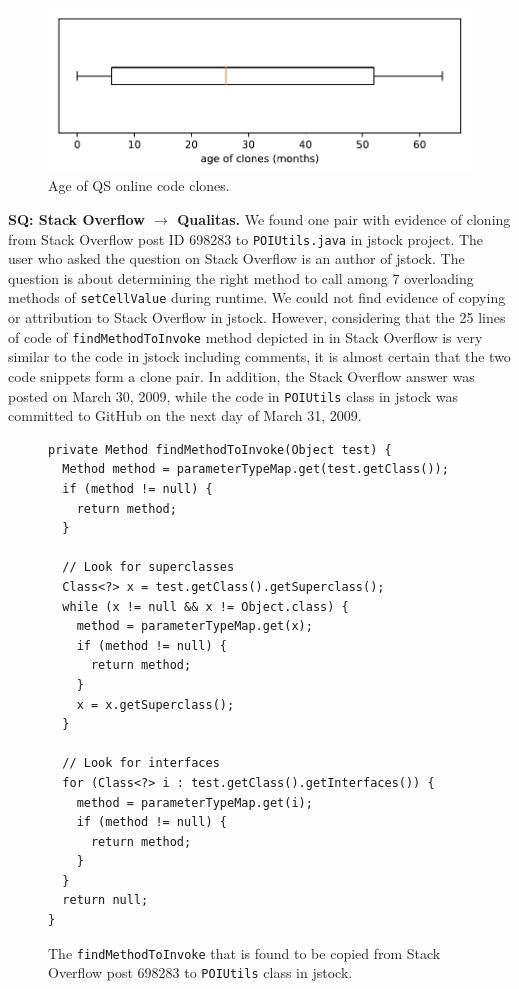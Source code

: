 \documentclass[10pt,journal,compsoc]{IEEEtran}
\begin{document}
\begin{figure}
	\centering
	\includegraphics[width=0.9\linewidth]{boxplot_clone_age}
	\caption{Age of QS online code clones.}
	\label{fig:boxplotcloneage}
\end{figure}

\textbf{SQ: Stack Overflow $\rightarrow$ Qualitas.} We found one pair with
evidence of cloning from Stack Overflow post ID 698283 to
{\small\texttt{POIUtils.java}} in \textsf{jstock} project. The user
 who asked the question on Stack Overflow is an author of
\textsf{jstock}. The question is about determining the right method to call
among 7 overloading methods of {\small\texttt{setCellValue}} during runtime. We
could not find evidence of copying or attribution to Stack Overflow in
\textsf{jstock}. However, considering that the 25 lines of code of
{\small\texttt{findMethodToInvoke}} method depicted in  in Stack
Overflow is very similar to the code in \textsf{jstock} including comments, it is almost certain that
the two code snippets form a clone pair. In addition, the Stack Overflow answer was
posted on March 30, 2009, while the code in {\small\texttt{POIUtils}} class in
\textsf{jstock} was committed to GitHub on the next day of March 31, 2009.

\begin{figure}
	\begin{lstlisting}
private Method findMethodToInvoke(Object test) {
  Method method = parameterTypeMap.get(test.getClass());
  if (method != null) {
    return method;
  }

  // Look for superclasses
  Class<?> x = test.getClass().getSuperclass();
  while (x != null && x != Object.class) {
    method = parameterTypeMap.get(x);
    if (method != null) {
      return method;
    }
    x = x.getSuperclass();
  }

  // Look for interfaces
  for (Class<?> i : test.getClass().getInterfaces()) {
    method = parameterTypeMap.get(i);
    if (method != null) {
      return method;
    }
  }
  return null;
}
	\end{lstlisting}\vspace{-2ex}
	\caption{The {\small\texttt{findMethodToInvoke}} that is found to be copied from Stack Overflow post 698283 to {\small\texttt{POIUtils}} class in \textsf{jstock}.}
	\label{fig:jstock_code}
\end{figure}
\end{document}
